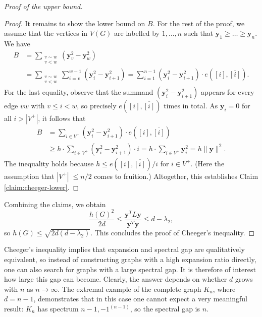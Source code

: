\begin{proof}[Proof of the upper bound]
\begin{proof}
        It remains to show the lower bound on $B$. 
        For the rest of the proof, we assume that the vertices in $V(G)$ are labelled by $1, \dots, n$ such that $\bm{y}_1 \ge \dots \ge \bm{y}_n$.
        We have
        \begin{align*}
            B &= \sum \limits_{\substack{v \sim w \\ v < w}} (\bm{y}_v^2 - \bm{y}_w^2) \\
                    &= \sum \limits_{\substack{v \sim w \\ v < w}} \sum \limits_{i = v}^{w - 1} (\bm{y}_i^2 - \bm{y}_{i + 1}^2) 
                = \sum \limits_{i = 1}^{n - 1} (\bm{y}_i^2 - \bm{y}_{i + 1}^2) \cdot e([i], \overline{[i]}).%
        \end{align*}
        For the last equality, observe that the summand $(\bm{y}_i^2 - \bm{y}_{i + 1}^2)$ appears for every edge $vw$ with $v \le i < w$, so precisely $e([i], \overline{[i]})$ times in total. 
        As $\bm{y}_{i} = 0$ for all $i > |V^+|$, it follows that
        \begin{align*}
            B &= \sum \limits_{i \in V^+} (\bm{y}_i^2 - \bm{y}_{i + 1}^2) \cdot e([i], \overline{[i]}) \\ 
                &\ge h \cdot \sum \limits_{i \in V^+} (\bm{y}_i^2 - \bm{y}_{i + 1}^2) \cdot i 
                = h \cdot \sum_{i \in V^+} \bm{y}_i^2 = h \|\bm{y}\|^2.
        \end{align*}
        The inequality holds because $h \le e([i], \overline{[i]}) / i$ for $i \in V^+$. 
        (Here the assumption that $|V^+|\; \le n/2$ comes to fruition.)
        Altogether, this establishes Claim \ref{claim:cheeger-lower}.
    \end{proof}

    Combining the claims, we obtain
    \begin{equation*}
        \frac{h(G)^2}{2d} \le \frac{\bm{y}^T L \bm{y}}{\bm{y}^T \bm{y}} \le d - \lambda_2,
    \end{equation*}
    so $h(G) \le \sqrt{2d (d - \lambda_2)}$. This concludes the proof of Cheeger's inequality.
\end{proof}

Cheeger's inequality implies that expansion and spectral gap are qualitatively equivalent, so instead of constructing graphs with a high expansion ratio directly, one can also search for graphs with a large spectral gap.
It is therefore of interest how large this gap can become.
Clearly, the answer depends on whether $d$ grows with $n$ as $n \rightarrow \infty$. 
The extremal example of the complete graph $K_n$, where $d = n - 1$, demonstrates that in this case one cannot expect a very meaningful result:
$K_n$ has spectrum $n-1,  -1^{(n - 1)}$, so the spectral gap is $n$.

